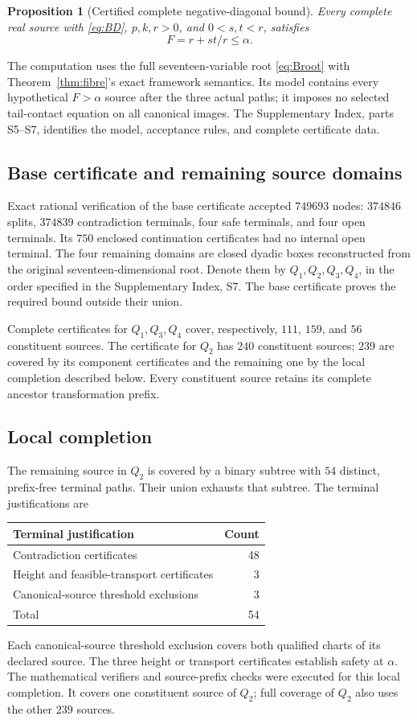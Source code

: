 \documentclass[11pt,reqno]{amsart}
\newtheorem{proposition}[theorem]{Proposition}
\theoremstyle{definition}
\theoremstyle{remark}
\begin{document}
\begin{proposition}[Certified complete negative-diagonal bound]
\label{prop:B}
Every complete real source with \eqref{eq:BD},
\(p,k,r>0\), and \(0<s,t<r\), satisfies
\[
F=r+st/r\le\alpha.
\]
\end{proposition}

The computation uses the full seventeen-variable root \eqref{eq:Broot}
with Theorem~\ref{thm:fibre}'s exact framework semantics.
Its model contains every hypothetical \(F>\alpha\) source after
the three actual paths; it imposes no selected tail-contact equation
on all canonical images. The Supplementary Index, parts S5--S7,
identifies the model, acceptance rules, and complete certificate data.

\subsection{Base certificate and remaining source domains}
Exact rational verification of the base certificate accepted
\(749693\) nodes: \(374846\) splits, \(374839\) contradiction terminals,
four safe terminals, and four open terminals. Its \(750\) enclosed
continuation certificates had no internal open terminal.
The four remaining domains are closed dyadic boxes reconstructed
from the original seventeen-dimensional root. Denote them by
\(Q_1,Q_2,Q_3,Q_4\), in the order specified in the Supplementary Index, S7.
The base certificate proves the required bound outside their union.

Complete certificates for \(Q_1,Q_3,Q_4\) cover, respectively,
\(111\), \(159\), and \(56\) constituent sources.
The certificate for \(Q_2\) has \(240\) constituent sources;
\(239\) are covered by its component certificates and the remaining
one by the local completion described below. Every constituent
source retains its complete ancestor transformation prefix.

\subsection{Local completion}
The remaining source in \(Q_2\) is covered by a binary subtree with
\(54\) distinct, prefix-free terminal paths. Their union exhausts
that subtree. The terminal justifications are
\begin{center}
\begin{tabular}{@{}lr@{}}
\toprule
Terminal justification&Count\\
\midrule
Contradiction certificates&48\\
Height and feasible-transport certificates&3\\
Canonical-source threshold exclusions&3\\
\midrule
Total&54\\
\bottomrule
\end{tabular}
\end{center}
Each canonical-source threshold exclusion covers both qualified
charts of its declared source. The three height or transport
certificates establish safety at \(\alpha\).
The mathematical verifiers and source-prefix checks were executed
for this local completion. It covers one constituent source of
\(Q_2\); full coverage of \(Q_2\) also uses the other \(239\) sources.
\end{document}
